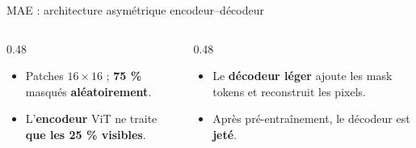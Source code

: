 \documentclass[aspectratio=169,10pt]{beamer}
\newcommand{\src}[1]{\par\vfill\hfill{\tiny\color{grisE}#1}}
\begin{document}
\begin{frame}{MAE : architecture asymétrique encodeur--décodeur}
  \centering
  \resizebox{0.95\linewidth}{!}{}
  \vspace{1mm}
  \begin{columns}[T]
    \begin{column}{0.48\textwidth}
      \begin{itemize}\footnotesize
        \item Patches $16\times16$ ; \textbf{75 \%} masqués \textbf{aléatoirement}.
        \item L'\textbf{encodeur} ViT ne traite \textbf{que les 25 \% visibles}.
      \end{itemize}
    \end{column}
    \begin{column}{0.48\textwidth}
      \begin{itemize}\footnotesize
        \item Le \textbf{décodeur léger} ajoute les mask tokens et reconstruit les pixels.
        \item Après pré-entraînement, le décodeur est \textbf{jeté}.
      \end{itemize}
    \end{column}
  \end{columns}
  \src{\citet{he2022mae}}
\end{frame}
\end{document}
